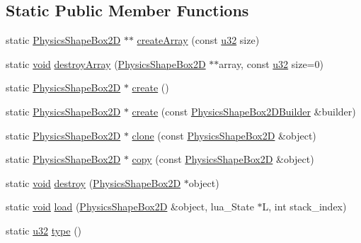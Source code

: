 \subsection*{Static Public Member Functions}
\begin{DoxyCompactItemize}
\item 
static \mbox{\hyperlink{classnjli_1_1_physics_shape_box2_d}{Physics\+Shape\+Box2D}} $\ast$$\ast$ \mbox{\hyperlink{classnjli_1_1_physics_shape_box2_d_ad8e533cb22ebf975b57fa5754922ae41}{create\+Array}} (const \mbox{\hyperlink{_util_8h_a10e94b422ef0c20dcdec20d31a1f5049}{u32}} size)
\item 
static \mbox{\hyperlink{_thread_8h_af1e856da2e658414cb2456cb6f7ebc66}{void}} \mbox{\hyperlink{classnjli_1_1_physics_shape_box2_d_ac9aadd4b0efeab6c170ad3f37ad8cf40}{destroy\+Array}} (\mbox{\hyperlink{classnjli_1_1_physics_shape_box2_d}{Physics\+Shape\+Box2D}} $\ast$$\ast$array, const \mbox{\hyperlink{_util_8h_a10e94b422ef0c20dcdec20d31a1f5049}{u32}} size=0)
\item 
static \mbox{\hyperlink{classnjli_1_1_physics_shape_box2_d}{Physics\+Shape\+Box2D}} $\ast$ \mbox{\hyperlink{classnjli_1_1_physics_shape_box2_d_a51f4d02cf43ee6927f982a93607e2655}{create}} ()
\item 
static \mbox{\hyperlink{classnjli_1_1_physics_shape_box2_d}{Physics\+Shape\+Box2D}} $\ast$ \mbox{\hyperlink{classnjli_1_1_physics_shape_box2_d_aea37ab0a015b2ea5c7960469a762cf18}{create}} (const \mbox{\hyperlink{classnjli_1_1_physics_shape_box2_d_builder}{Physics\+Shape\+Box2\+D\+Builder}} \&builder)
\item 
static \mbox{\hyperlink{classnjli_1_1_physics_shape_box2_d}{Physics\+Shape\+Box2D}} $\ast$ \mbox{\hyperlink{classnjli_1_1_physics_shape_box2_d_a6a2976c0d404af777361ca4e20721b6a}{clone}} (const \mbox{\hyperlink{classnjli_1_1_physics_shape_box2_d}{Physics\+Shape\+Box2D}} \&object)
\item 
static \mbox{\hyperlink{classnjli_1_1_physics_shape_box2_d}{Physics\+Shape\+Box2D}} $\ast$ \mbox{\hyperlink{classnjli_1_1_physics_shape_box2_d_a83239f524d6261f9717e0ac238cddd00}{copy}} (const \mbox{\hyperlink{classnjli_1_1_physics_shape_box2_d}{Physics\+Shape\+Box2D}} \&object)
\item 
static \mbox{\hyperlink{_thread_8h_af1e856da2e658414cb2456cb6f7ebc66}{void}} \mbox{\hyperlink{classnjli_1_1_physics_shape_box2_d_a673615f3b7ae376a2c3baddc97df5f4a}{destroy}} (\mbox{\hyperlink{classnjli_1_1_physics_shape_box2_d}{Physics\+Shape\+Box2D}} $\ast$object)
\item 
static \mbox{\hyperlink{_thread_8h_af1e856da2e658414cb2456cb6f7ebc66}{void}} \mbox{\hyperlink{classnjli_1_1_physics_shape_box2_d_a9d71f53154968a269d4cc45feebb106d}{load}} (\mbox{\hyperlink{classnjli_1_1_physics_shape_box2_d}{Physics\+Shape\+Box2D}} \&object, lua\+\_\+\+State $\ast$L, int stack\+\_\+index)
\item 
static \mbox{\hyperlink{_util_8h_a10e94b422ef0c20dcdec20d31a1f5049}{u32}} \mbox{\hyperlink{classnjli_1_1_physics_shape_box2_d_ab37ca536b706f65c2321c9609ba2f462}{type}} ()
\end{DoxyCompactItemize}

